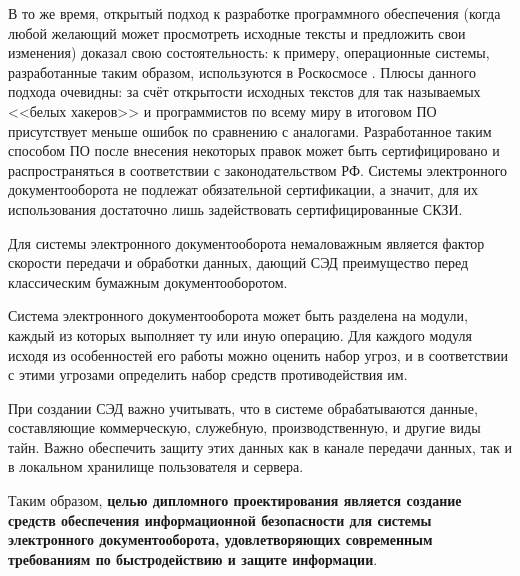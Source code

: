 \vspace{\baselineskip}
В то же время, открытый подход к разработке программного обеспечения (когда любой желающий может просмотреть исходные тексты и предложить свои изменения) доказал свою состоятельность: к примеру, операционные системы, разработанные таким образом, используются в Роскосмосе \cite{roskosmos}. Плюсы данного подхода очевидны: за счёт открытости исходных текстов для так называемых <<белых хакеров>> и программистов по всему миру в итоговом ПО присутствует меньше ошибок по сравнению с аналогами. Разработанное таким способом ПО после внесения некоторых правок может быть сертифицировано и распространяться в соответствии с законодательством РФ. Системы электронного документооборота не подлежат обязательной сертификации, а значит, для их использования достаточно лишь задействовать сертифицированные СКЗИ.

\vspace{\baselineskip}
Для системы электронного документооборота немаловажным является фактор скорости передачи и обработки данных, дающий СЭД преимущество перед классическим бумажным документооборотом.

\vspace{\baselineskip}
Система электронного документооборота может быть разделена на модули, каждый из которых выполняет ту или иную операцию. Для каждого модуля исходя из особенностей его работы можно оценить набор угроз, и в соответствии с этими угрозами определить набор средств противодействия им.

\vspace{\baselineskip}
При создании СЭД важно учитывать, что в системе обрабатываются данные, составляющие коммерческую, служебную, производственную, и другие виды тайн. Важно обеспечить защиту этих данных как в канале передачи данных, так и в локальном хранилище пользователя и сервера.

\vspace{\baselineskip}
Таким образом, \textbf{целью дипломного проектирования является создание средств обеспечения информационной безопасности для системы электронного документооборота, удовлетворяющих современным требованиям по быстродействию и защите информации}.